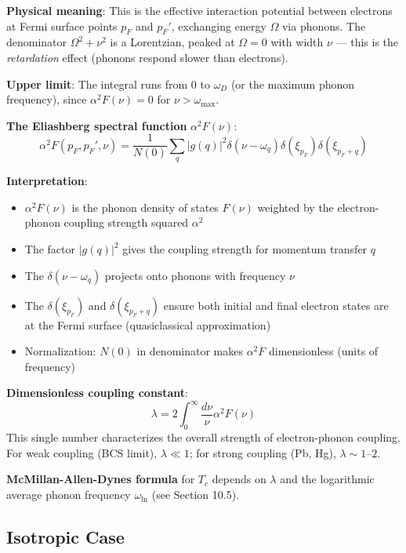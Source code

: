 \documentclass[12pt]{article}
\begin{document}
\textbf{Physical meaning}: This is the effective interaction potential between electrons at Fermi surface points $p_F$ and $p_F'$, exchanging energy $\Omega$ via phonons. The denominator $\Omega^2 + \nu^2$ is a Lorentzian, peaked at $\Omega = 0$ with width $\nu$ — this is the \textit{retardation} effect (phonons respond slower than electrons).

\textbf{Upper limit}: The integral runs from $0$ to $\omega_D$ (or the maximum phonon frequency), since $\alpha^2F(\nu) = 0$ for $\nu > \omega_{\text{max}}$.

\textbf{The Eliashberg spectral function} $\alpha^2F(\nu)$:
\begin{equation}
\boxed{
\alpha^2F(p_F, p_F', \nu) = \frac{1}{N(0)} \sum_q |g(q)|^2 \delta(\nu - \omega_q) \delta(\xi_{p_F}) \delta(\xi_{p_F + q})
}
\end{equation}

\textbf{Interpretation}:
\begin{itemize}
\item $\alpha^2F(\nu)$ is the phonon density of states $F(\nu)$ weighted by the electron-phonon coupling strength squared $\alpha^2$
\item The factor $|g(q)|^2$ gives the coupling strength for momentum transfer $q$
\item The $\delta(\nu - \omega_q)$ projects onto phonons with frequency $\nu$
\item The $\delta(\xi_{p_F})$ and $\delta(\xi_{p_F+q})$ ensure both initial and final electron states are at the Fermi surface (quasiclassical approximation)
\item Normalization: $N(0)$ in denominator makes $\alpha^2F$ dimensionless (units of frequency)
\end{itemize}

\textbf{Dimensionless coupling constant}:
\begin{equation}
\lambda = 2\int_0^{\infty} \frac{d\nu}{\nu} \alpha^2F(\nu)
\end{equation}
This single number characterizes the overall strength of electron-phonon coupling. For weak coupling (BCS limit), $\lambda \ll 1$; for strong coupling (Pb, Hg), $\lambda \sim 1\text{--}2$.

\textbf{McMillan-Allen-Dynes formula} for $T_c$ depends on $\lambda$ and the logarithmic average phonon frequency $\omega_{\ln}$ (see Section 10.5).

\subsection{Isotropic Case}
\end{document}
